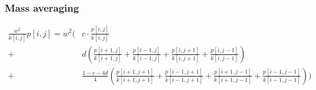 \documentclass[revised,endfloat]{geophysics}
\begin{document}
\subsubsection{Mass averaging}
\begin{equation}
\begin{split}
\frac{w^2}{k[i,j]}p[i,j] = w^2( &c \cdot \frac{p[i,j]}{k[i,j]} \\ 
+ &d (\frac{p[i+1,j]}{k[i+1,j]}+\frac{p[i-1,j]}{k[i-1,j]}+\frac{p[i,j+1]}{k[i,j+1]}+\frac{p[i,j-1]}{k[i,j-1]}) \\
+ & \frac{1-c-4d}{4} (\frac{p[i+1,j+1]}{k[i+1,j+1]}+\frac{p[i-1,j+1]}{k[i-1,j+1]}+\frac{p[i+1,j-1]}{k[i+1,j-1]}+ \frac{p[i-1,j-1]}{k[i-1,j-1]}) ) \\ 
\end{split}
\label{eq112}
\end{equation}
\end{document}
